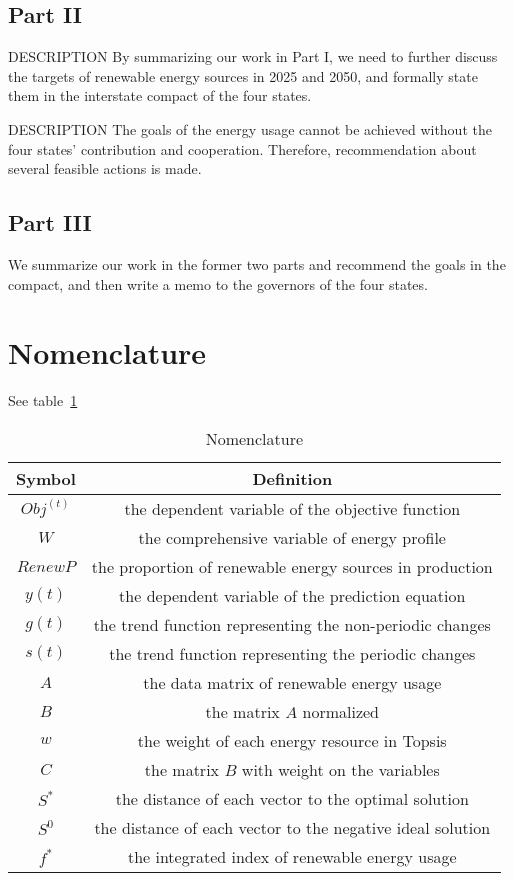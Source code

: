 \documentclass{mcmthesis}
\makeatletter
\newcommand{\DESCRIPTION@original@item}{}
\let\DESCRIPTION@original@item\item
\newcommand*{\DESCRIPTION@envir}{DESCRIPTION}
\newlength{\DESCRIPTION@totalleftmargin}
\newlength{\DESCRIPTION@linewidth}
\newcommand{\DESCRIPTION@makelabel}[1]{\llap{#1}}%
\newcommand{\DESCRIPTION@item}[1][]{%
  \setlength{\@totalleftmargin}%
       {\DESCRIPTION@totalleftmargin+\widthof{\textbf{#1 }}-\leftmargin}%
  \setlength{\linewidth}
       {\DESCRIPTION@linewidth-\widthof{\textbf{#1 }}+\leftmargin}%
  \par\parshape \@ne \@totalleftmargin \linewidth
  \DESCRIPTION@original@item[\textbf{#1}]%
}
\newenvironment{DESCRIPTION}
  {\list{}{\setlength{\labelwidth}{0cm}%
           \let\makelabel\DESCRIPTION@makelabel}%
   \setlength{\DESCRIPTION@totalleftmargin}{\@totalleftmargin}%
   \setlength{\DESCRIPTION@linewidth}{\linewidth}%
   \renewcommand{\item}{\ifx\@currenvir\DESCRIPTION@envir
                           \expandafter\DESCRIPTION@item
                        \else
                           \expandafter\DESCRIPTION@original@item
                        \fi}}
  {\endlist}
\makeatother
\begin{document}
\subsection{Part II}
\begin{DESCRIPTION}

\item [A] By summarizing our work in Part I, we need to further discuss the targets of renewable energy sources in 2025 and 2050, and formally state them in the interstate compact of the four states.

\item [B] The goals of the energy usage cannot be achieved without the four states' contribution and cooperation.
Therefore, recommendation about several feasible actions is made.
\end{DESCRIPTION}

\subsection{Part III}
We summarize our work in the former two parts and recommend the goals in the compact, and then write a memo to the governors of the four states.

\section{Nomenclature}
See table~\ref{table:nomenclature}

\begin{table}[h]
\centering
\begin{tabular}{cc}
\hline Symbol & Definition \\ \hline
$Obj^{(t)}$ & the dependent variable of the objective function \\
$W$ & the comprehensive variable of energy profile \\
$RenewP$ & the proportion of renewable energy sources in production \\
$y(t)$ & the dependent variable of the prediction equation \\
$g(t)$ & the trend function representing the non-periodic changes \\
$s(t)$ & the trend function representing the periodic changes \\
$A$ & the data matrix of renewable energy usage \\
$B$ & the matrix $A$ normalized \\ 
$w$ & the weight of each energy resource in Topsis \\
$C$ & the matrix $B$ with weight on the variables \\
$S^{*}$ & the distance of each vector to the optimal solution \\
$S^{0}$ & the distance of each vector to the negative ideal solution \\
$f^{*}$ & the integrated index of renewable energy usage
\end{tabular}
\caption{Nomenclature}
\label{table:nomenclature}
\end{table}
\end{document}
